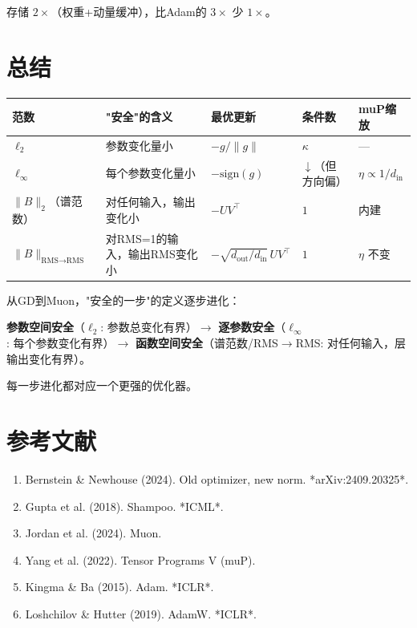 \documentclass[12pt,a4paper]{article}
\begin{document}
存储 $2\times$（权重+动量缓冲），比Adam的 $3\times$ 少 $1\times$。







\section{总结}







\begin{center}\small
\begin{longtable}{|l|l|l|l|l|}
\hline
范数 & "安全"的含义 & 最优更新 & 条件数 & muP缩放 \\
\hline
$\ell_2$ & 参数变化量小 & $-g/\|g\|$ & $\kappa$ & — \\
$\ell_\infty$ & 每个参数变化量小 & $-\text{sign}(g)$ & $\downarrow$（但方向偏） & $\eta \propto 1/d_{\text{in}}$ \\
$\|B\|_2$（谱范数） & 对任何输入，输出变化小 & $-UV^\top$ & $1$ & 内建 \\
$\|B\|_{\text{RMS}\to\text{RMS}}$ & 对RMS=1的输入，输出RMS变化小 & $-\sqrt{d_{\text{out}}/d_{\text{in}}}\,UV^\top$ & $1$ & $\eta$ 不变 \\
\hline
\end{longtable}
\end{center}





\begin{insightbox}
从GD到Muon，"安全的一步"的定义逐步进化：

\textbf{参数空间安全}（$\ell_2$: 参数总变化有界）$\to$ \textbf{逐参数安全}（$\ell_\infty$: 每个参数变化有界）$\to$ \textbf{函数空间安全}（谱范数/RMS$\to$RMS: 对任何输入，层输出变化有界）。

每一步进化都对应一个更强的优化器。
\end{insightbox}





\section{参考文献}

\begin{enumerate}[leftmargin=*,nosep]
\item Bernstein \& Newhouse (2024). Old optimizer, new norm. *arXiv:2409.20325*.
\item Gupta et al. (2018). Shampoo. *ICML*.
\item Jordan et al. (2024). Muon.
\item Yang et al. (2022). Tensor Programs V (muP).
\item Kingma \& Ba (2015). Adam. *ICLR*.
\item Loshchilov \& Hutter (2019). AdamW. *ICLR*.

\end{enumerate}
\end{document}

